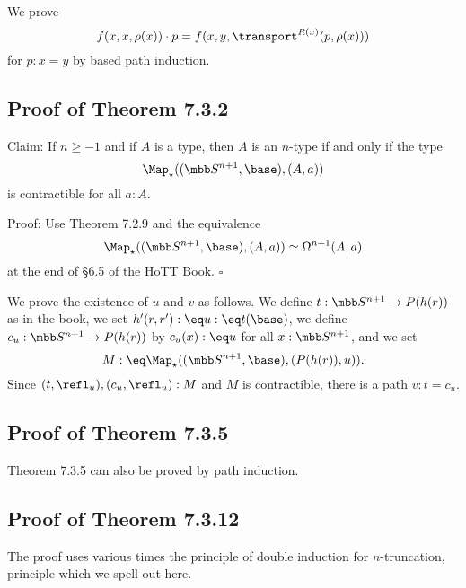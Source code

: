 \documentclass[12pt]{article}
\begin{document}
We prove 
$$
f(x,x,\rho(x))\cdot p=f(x,y,\transport^{R(x)}(p,\rho(x)))
$$ 
for $p:x=y$ by based path induction.





\subsection{Proof of Theorem 7.3.2}

Claim: If $n\ge-1$ and if $A$ is a type, then $A$ is an $n$-type if and only if the type 
$$
\Map_\star((\mbb S^{n+1},\base),(A,a))
$$ 
is contractible for all $a:A$.

\nn Proof: Use Theorem 7.2.9 and the equivalence 
$$
\Map_\star((\mbb S^{n+1},\base),(A,a))\simeq\Omega^{n+1}(A,a)
$$ 
at the end of \S6.5 of the HoTT Book. $\square$

We prove the existence of $u$ and $v$ as follows. We define $t:\mbb S^{n+1}\to P(h(r))$ as in the book, we set $h'(r,r'):\eq u:\eq t(\base)$, we define $c_u:\mbb S^{n+1}\to P(h(r))$ by $c_u(x):\eq u$ for all $x:\mbb S^{n+1}$, and we set
$$
M:\eq\Map_\star((\mbb S^{n+1},\base),(P(h(r)),u)).
$$ 
Since $(t,\refl_u),(c_u,\refl_u):M$ and $M$ is contractible, there is a path $v:t=c_u$.


\subsection{Proof of Theorem 7.3.5}

Theorem 7.3.5 can also be proved by path induction.


\subsection{Proof of Theorem 7.3.12}

The proof uses various times the principle of double induction for $n$-truncation, principle which we spell out here.
\end{document}
